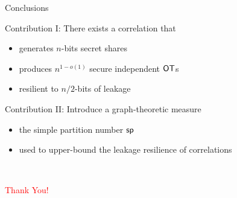 \begin{frame}{Conclusions}

	{
		\begin{block} {Contribution I: There exists a correlation that}
			\begin{itemize}
				\item generates $ n $-bits secret shares
				\item produces $ n^{1-o(1)} $ secure independent $\OT$s
				\item resilient to $ n/2 $-bits of leakage 
			\end{itemize}
		\end{block}
		
		\pause
		
		\begin{block} {Contribution II: Introduce a graph-theoretic measure}
			\begin{itemize}
				\item the simple partition number $ \mathsf{sp} $
				\item used to upper-bound the leakage resilience of correlations 
			\end{itemize}
		\end{block}
		
	}

	\pause\
	
	\begin{center}
		\textcolor{red}{\Huge{Thank You!}}
	\end{center}

\end{frame}